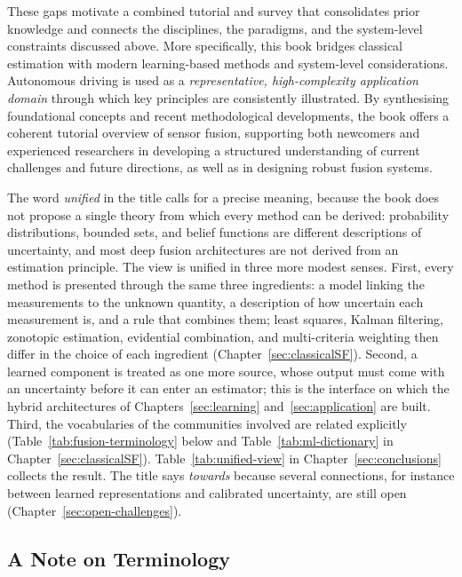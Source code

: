 These gaps motivate a combined tutorial and survey that consolidates prior knowledge and connects the disciplines, the paradigms, and the system-level constraints discussed above. More specifically, this book bridges classical estimation with modern learning-based methods and system-level considerations. Autonomous driving is used as a \emph{representative, high-complexity application domain} through which key principles are consistently illustrated. By synthesising foundational concepts and recent methodological developments, the book offers a coherent tutorial overview of sensor fusion, supporting both newcomers and experienced researchers in developing a structured understanding of current challenges and future directions, as well as in designing robust fusion systems.

The word \emph{unified} in the title calls for a precise meaning, because the book does not propose a single theory from which every method can be derived: probability distributions, bounded sets, and belief functions are different descriptions of uncertainty, and most deep fusion architectures are not derived from an estimation principle. The view is unified in three more modest senses. First, every method is presented through the same three ingredients: a model linking the measurements to the unknown quantity, a description of how uncertain each measurement is, and a rule that combines them; least squares, Kalman filtering, zonotopic estimation, evidential combination, and multi-criteria weighting then differ in the choice of each ingredient (Chapter~\ref{sec:classicalSF}). Second, a learned component is treated as one more source, whose output must come with an uncertainty before it can enter an estimator; this is the interface on which the hybrid architectures of Chapters~\ref{sec:learning} and~\ref{sec:application} are built. Third, the vocabularies of the communities involved are related explicitly (Table~\ref{tab:fusion-terminology} below and Table~\ref{tab:ml-dictionary} in Chapter~\ref{sec:classicalSF}). Table~\ref{tab:unified-view} in Chapter~\ref{sec:conclusions} collects the result. The title says \emph{towards} because several connections, for instance between learned representations and calibrated uncertainty, are still open (Chapter~\ref{sec:open-challenges}).

\subsection{A Note on Terminology}
\label{subsec:terminology}


